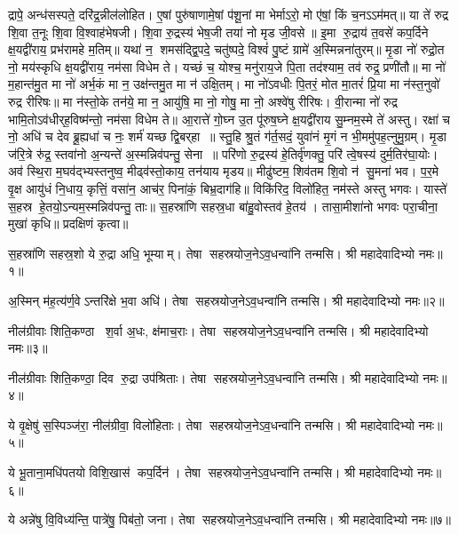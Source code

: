 द्रापे॒ अन्ध॑सस्पते॒ दरि॑द्र॒न्नील॑लोहित। ए॒षां पुरु॑षाणामे॒षां प॑शू॒नां मा भेर्माऽरो॒ मो ए॑षां॒ किं च॒नऽऽम॑मत्॥ या ते॑ रुद्र शि॒वा त॒नूः शि॒वा वि॒श्वाह॑भेषजी। शि॒वा रु॒द्रस्य॑ भेष॒जी तया॑ नो मृड जी॒वसे॥ इ॒मा रु॒द्राय॑ त॒वसे॑ कप॒र्दिने क्ष॒यद्वी॑राय॒ प्रभ॑रामहे म॒तिम्॥ यथा॑ न॒ शमस॑द्द्वि॒पदे॒ चतु॑ष्पदे॒ विश्वं॑ पु॒ष्टं ग्रामे॑ अ॒स्मिन्नना॑तुरम्॥ मृ॒डा नो॑ रुद्रो॒त नो॒ मय॑स्कृधि क्ष॒यद्वी॑राय॒ नम॑सा विधेम ते। यच्छं च॒ योश्च॒ मनु॑राय॒जे पि॒ता तद॑श्याम॒ तव॑ रुद्र॒ प्रणी॑तौ॥ मा नो॑ म॒हान्त॑मु॒त मा नो॑ अर्भ॒कं मा न॒ उक्ष॑न्तमु॒त मा न॑ उक्षि॒तम्। मा नो॑ऽवधीः पि॒तरं॒ मोत मा॒तरं॑ प्रि॒या मा न॑स्त॒नुवो॑ रुद्र रीरिषः॥ मा न॑स्तो॒के तन॑ये॒ मा न॒ आयु॑षि॒ मा नो॒ गोषु॒ मा नो॒ अश्वे॑षु रीरिषः। वी॒रान्मा नो॑ रुद्र भामि॒तोऽव॑धीर्‌ह॒विष्म॑न्तो॒ नम॑सा विधेम ते॥ आ॒रात्ते॑ गो॒घ्न उ॒त पू॑रुष॒घ्ने क्ष॒यद्वी॑राय सु॒म्नम॒स्मे ते॑ अस्तु। रक्षा॑ च नो॒ अधि॑ च देव ब्रू॒ह्यधा॑ च नः॒ शर्म॑ यच्छ द्वि॒बर्‌हा॥ स्तु॒हि श्रु॒तं ग॑र्त॒सदं॒ युवा॑नं मृ॒गं न भी॒ममु॑पह॒त्नुमु॒ग्रम्। मृ॒डा ज॑रि॒त्रे रु॑द्र॒ स्तवा॑नो अ॒न्यन्ते॑ अ॒स्मन्निव॑पन्तु॒ सेना॥ परि॑णो रु॒द्रस्य॑ हे॒तिर्वृ॑णक्तु॒ परि॑ त्वे॒षस्य॑ दुर्म॒तिर॑घा॒योः। अव॑ स्थि॒रा म॒घव॑द्भ्यस्तनुष्व॒ मीढ्व॑स्तो॒काय॒ तन॑याय मृडय॥ मीढु॑ष्टम॒ शिव॑तम शि॒वो न॑ सु॒मना॑ भव। प॒र॒मे वृ॒क्ष आयु॑धं नि॒धाय॒ कृत्तिं॒ वसा॑न॒ आच॑र॒ पिना॑कं॒ बिभ्र॒दाग॑हि॥ विकि॑रिद॒ विलो॑हित॒ नम॑स्ते अस्तु भगवः। यास्ते॑ स॒हस्र हे॒तयो॒ऽन्यम॒स्मन्निव॑पन्तु॒ ताः॥ स॒हस्रा॑णि सहस्र॒धा बा॑हु॒वोस्तव॑ हे॒तय॑। तासा॒मीशा॑नो भगवः परा॒चीना॒ मुखा॑ कृधि॥
प्रदक्षिणं कृत्वा॥


{\small \closesection}



स॒हस्रा॑णि सहस्र॒शो ये रु॒द्रा अधि॒ भूम्याम्। तेषा सहस्रयोज॒ने\-ऽव॒धन्वा॑नि तन्मसि। श्री महादेवादिभ्यो नमः॥१॥

अ॒स्मिन् म॑ह॒त्य॑र्ण॒वेऽन्तरि॑क्षे भ॒वा अधि॑। तेषा सहस्रयोज॒ने\-ऽव॒धन्वा॑नि तन्मसि। श्री महादेवादिभ्यो नमः॥२॥

नील॑ग्रीवाः शिति॒कण्ठा श॒र्वा अ॒धः, क्ष॑माच॒राः। तेषा सहस्रयोज॒ने\-ऽव॒धन्वा॑नि तन्मसि। श्री महादेवादिभ्यो नमः॥३॥

नील॑ग्रीवाः शिति॒कण्ठा॒ दिव रु॒द्रा उप॑श्रिताः। तेषा सहस्रयोज॒ने\-ऽव॒धन्वा॑नि तन्मसि। श्री महादेवादिभ्यो नमः॥४॥

ये वृ॒क्षेषु॑ स॒स्पिञ्ज॑रा॒ नील॑ग्रीवा॒ विलो॑हिताः। तेषा सहस्रयोज॒ने\-ऽव॒धन्वा॑नि तन्मसि। श्री महादेवादिभ्यो नमः॥५॥

ये भू॒ताना॒मधि॑पतयो विशि॒खास॑ कप॒र्दिन॑। तेषा सहस्रयोज॒ने\-ऽव॒धन्वा॑नि तन्मसि। श्री महादेवादिभ्यो नमः॥६॥

ये अन्ने॑षु वि॒विध्य॑न्ति॒ पात्रे॑षु॒ पिब॑तो॒ जना\sn। तेषा सहस्रयोज॒ने\-ऽव॒धन्वा॑नि तन्मसि। श्री महादेवादिभ्यो नमः॥७॥

